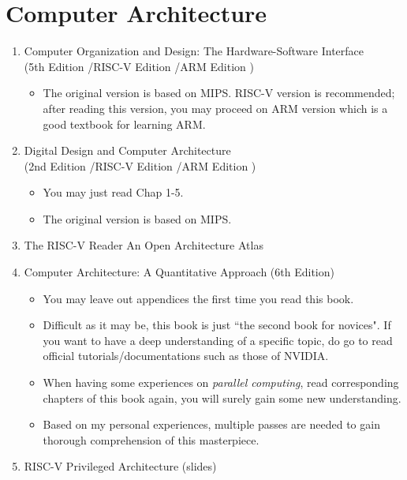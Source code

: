 \documentclass{article}
\begin{document}
\section{Computer Architecture}
\begin{enumerate}
    \item Computer Organization and Design: The Hardware-Software Interface\\
    (5th Edition \cite{patterson2013computerMIPS}/RISC-V Edition \cite{pattersoncomputerRV}/ARM Edition \cite{patterson2016computerARM})
    \begin{itemize}
        \item The original version is based on MIPS.
        RISC-V version is recommended; after reading this version, you may proceed on ARM version which is a good textbook for learning ARM.
    \end{itemize}
    \item Digital Design and Computer Architecture\\
    (2nd Edition \cite{harris2015digitalMIPS}/RISC-V Edition \cite{harris2021digitalRV}/ARM Edition \cite{harris2015digitalARM})
    \begin{itemize}
        \item You may just read Chap 1-5.
        \item The original version is based on MIPS.
    \end{itemize}
    \item The RISC-V Reader An Open Architecture Atlas \cite{patterson2017risc}
    \item Computer Architecture: A Quantitative Approach (6th Edition) \cite{hennessy2018computer}
    \begin{itemize}
        \item You may leave out appendices the first time you read this book.
        \item Difficult as it may be, this book is just ``the second book for novices".
        If you want to have a deep understanding of a specific topic, do go to read official tutorials/documentations such as those of NVIDIA.
        \item When having some experiences on \emph{parallel computing}, read corresponding chapters of this book again, you will surely gain some new understanding.
        \item Based on my personal experiences, multiple passes are needed to gain thorough comprehension of this masterpiece.
    \end{itemize}
    \item RISC-V Privileged Architecture (slides)\\

\end{enumerate}
\end{document}
